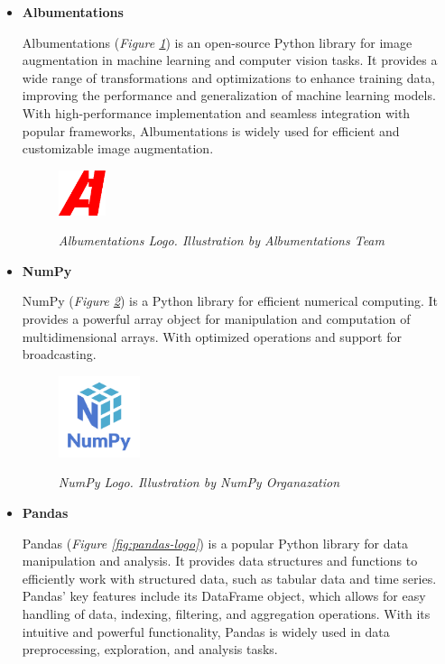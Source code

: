 \begin{itemize}
\item \textbf{Albumentations}

Albumentations (\textit{Figure \ref{fig:albumentations-logo}}) is an open-source Python library for image augmentation in machine learning and computer vision tasks. It provides a wide range of transformations and optimizations to enhance training data, improving the performance and generalization of machine learning models. With high-performance implementation and seamless integration with popular frameworks, Albumentations is widely used for efficient and customizable image augmentation.

\begin{figure}[H]
\centering
\includegraphics[width=0.13\textwidth]{imatges/studies_and_decisions/albumentations-logo.png}
\caption[Albumentations Logo]{\textit{Albumentations Logo. Illustration by Albumentations Team}}
{\label{fig:albumentations-logo}}
\end{figure}

\item \textbf{NumPy}

NumPy (\textit{Figure \ref{fig:numpy-logo}}) is a Python library for efficient numerical computing. It provides a powerful array object for manipulation and computation of multidimensional arrays. With optimized operations and support for broadcasting.

\begin{figure}[H]
\centering
\includegraphics[width=0.225\textwidth]{imatges/studies_and_decisions/numpy-logo.png}
\caption[NumPy Logo]{\textit{NumPy Logo. Illustration by NumPy Organazation}}
{\label{fig:numpy-logo}}
\end{figure}

\item \textbf{Pandas}

Pandas (\textit{Figure \ref{fig:pandas-logo}}) is a popular Python library for data manipulation and analysis. It provides data structures and functions to efficiently work with structured data, such as tabular data and time series. Pandas' key features include its DataFrame object, which allows for easy handling of data, indexing, filtering, and aggregation operations. With its intuitive and powerful functionality, Pandas is widely used in data preprocessing, exploration, and analysis tasks.


\end{itemize}
